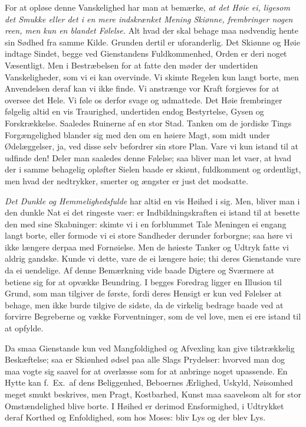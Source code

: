 \documentclass[12pt,a4paper]{article}
\newcommand{\opage}[1]{\marginnote{\footnotesize\textit{[#1]}}}
\begin{document}
\opage{255} For at opløse denne Vanskelighed har man at bemærke, \emph{at det Høie ei, ligesom det
Smukke eller det i en mere indskrænket Mening Skiønne, frembringer nogen reen, men kun en
blandet Følelse.} Alt hvad der skal behage maa nødvendig hente sin Sødhed fra samme Kilde.
Grunden dertil er uforanderlig. Det Skiønne og Høie indtage Sindet, begge ved Gienstandens
Fuldkommenhed, Orden er deri noget Væsentligt. Men i Bestræbelsen for at fatte den møder
der undertiden Vanskeligheder, som vi ei kan overvinde. Vi skimte Regelen kun langt borte,
men Anvendelsen deraf kan vi ikke finde. Vi anstrænge vor Kraft forgieves for at oversee
det Hele. Vi føle os derfor svage og udmattede. Det Høie frembringer følgelig altid en vis
Traurighed, undertiden endog Bestyrtelse, Gysen og Forskrækkelse. Saaledes Ruinerne af en
stor Stad. Tanken om de jordiske Tings Forgængelighed blander sig med den om en høiere
Magt, som midt under Ødelæggelser, ja, ved disse selv befordrer sin store Plan. Vare vi kun
istand til at udfinde den! Deler man saaledes denne Følelse; saa bliver man let vaer, at
hvad der i samme behagelig opløfter Sielen baade er skiønt, fuldkomment og ordentligt, men
hvad der nedtrykker, smerter og ængster er just det modsatte.

\emph{Det Dunkle og Hemmelighedsfulde} har altid en vis Høihed i sig. Men, bliver man i den
\opage{256} dunkle Nat ei det ringeste vaer: er Indbildningskraften ei istand til at besette den med
sine Skabninger: skimte vi i en forblummet Tale Meningen ei engang langt borte, eller
formode vi ei store Sandheder derunder forborgne; saa høre vi ikke længere derpaa med
Fornøielse. Men de høieste Tanker og Udtryk fatte vi aldrig gandske. Kunde vi dette, vare
de ei længere høie; thi deres Gienstande vare da ei uendelige. Af denne Bemærkning vide
baade Digtere og Sværmere at betiene sig for at opvække Beundring. I begges Foredrag ligger
en Illusion til Grund, som man tilgiver de første, fordi deres Hensigt er kun ved Følelser
at behage, men ikke burde tilgive de sidste, da de virkelig bedrage baade ved at forvirre
Begreberne og vække Forventninger, som de vel love, men ei ere istand til at opfylde.

Da smaa Gienstande kun ved Mangfoldighed og Afvexling kan give tilstrækkelig Beskæftelse;
saa er Skiønhed ødsel paa alle Slags Prydelser: hvorved man dog maa vogte sig saavel for at
overlæsse som for at anbringe noget upassende. En Hytte kan f.~Ex.\ af dens Beliggenhed,
Beboernes Ærlighed, Uskyld, Nøisomhed meget smukt beskrives, men Pragt, Kostbarhed, Kunst
maa saavelsom alt for stor Omstændelighed blive borte. I Høihed er derimod Ensformighed, i
Udtrykket deraf Korthed og Enfoldighed, som hos Moses: bliv Lys og der blev Lys.
\end{document}
